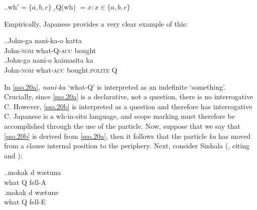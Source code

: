 \documentclass[11pt]{article}
\begin{document}
\ex.\label{sso.10}\a.wh$' = \{a,b,c\}$
   \b.Q(wh) $= x: x \in \{a,b,c\}$
   
Empirically, Japanese \citep{hagstrom:1998} provides a very clear example of this:

\ex.\ag.\label{sso.20a}John-ga nani-ka-o katta\\
  John-\textsc{nom} what-Q-\textsc{acc} bought\\
  \bg.\label{sso.20b}John-ga nani-o kaimasita ka\\
  John-\textsc{nom} what-\textsc{acc} bought.\textsc{polite} Q\\

In \ref{sso.20a}, \textit{nani-ka} `what-Q' is interpreted as an indefinite `something'. Crucially, since \ref{sso.20a} is a declarative, not a question, there is no interrogative C. However, \ref{sso.20b} is interpreted as a question and therefore has interrogative C. Japanese is a wh-in-situ language, and scope marking must therefore be accomplished through the use of the particle. Now, suppose that we say that \ref{sso.20b} is derived from \ref{sso.20a}, then it follows that the particle \textit{ka} has moved from a clause internal position to the periphery. Next, consider Sinhala (\cite{slade:2011}, citing \cite{gair-sumangala:1991} and \cite{hagstrom:1998}):

\ex.\ag.\label{sso.30a}mokak d{\textschwa} w{\ae}tuna\\
   what Q fell-A\\
   \bg.\label{sso.30b}mokak d{\textschwa} w{\ae}tune\\
   what Q fell-E\\
\end{document}

